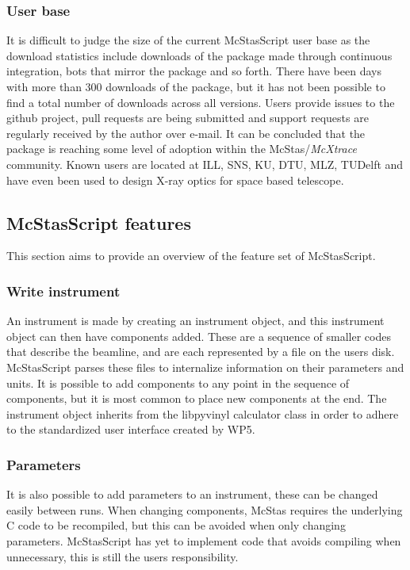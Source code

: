 \documentclass[11pt, a4paper]{article}
\begin{document}
\subsubsection{User base}
It is difficult to judge the size of the current McStasScript user base as the download statistics include downloads of the package made through continuous integration, bots that mirror the package and so forth. There have been days with more than 300 downloads of the package, but it has not been possible to find a total number of downloads across all versions. Users provide issues to the github project, pull requests are being submitted and support requests are regularly received by the author over e-mail. It can be concluded that the package is reaching some level of adoption within the McStas/\textit{McXtrace} community. Known users are located at ILL, SNS, KU, DTU, MLZ, TUDelft and have even been used to design X-ray optics for space based telescope.

\subsection{McStasScript features}
This section aims to provide an overview of the feature set of McStasScript.

\subsubsection{Write instrument}
An instrument is made by creating an instrument object, and this instrument object can then have components added. These are a sequence of smaller codes that describe the beamline, and are each represented by a file on the users disk. McStasScript parses these files to internalize information on their parameters and units. It is possible to add components to any point in the sequence of components, but it is most common to place new components at the end. The instrument object inherits from the libpyvinyl calculator class in order to adhere to the standardized user interface created by WP5.

\subsubsection{Parameters}
It is also possible to add parameters to an instrument, these can be changed easily between runs. When changing components, McStas requires the underlying C code to be recompiled, but this can be avoided when only changing parameters. McStasScript has yet to implement code that avoids compiling when unnecessary, this is still the users responsibility.
\end{document}
